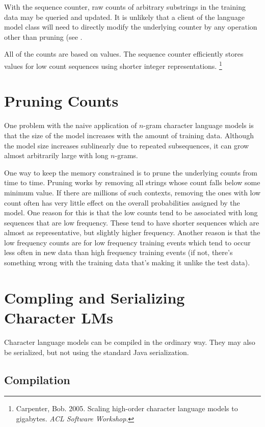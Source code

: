 With the sequence counter, raw counts of arbitrary substrings in
the training data may be queried and updated.  It is unlikely that
a client of the language model class will need to directly modify
the underlying counter by any operation other than pruning (see
.  

All of the counts are based on  values.  The sequence
counter efficiently stores values for low count sequences using
shorter integer representations.%
%
\footnote{Carpenter, Bob.  2005.  Scaling high-order character
language models to gigabytes. {\it ACL Software Workshop}.}



\section{Pruning Counts}\label{section:char-lm-pruning}

One problem with the naive application of $n$-gram character
language models is that the size of the model increases with
the amount of training data.  Although the model size increases
sublinearly due to repeated subsequences, it can grow almost
arbitrarily large with long $n$-grams.

One way to keep the memory constrained is to prune the underlying
counts from time to time.  Pruning works by removing all strings whose
count falls below some minimum value.  If there are millions of such
contexts, removing the ones with low count often has very little
effect on the overall probabilities assigned by the model.  One reason
for this is that the low counts tend to be associated with long
sequences that are low frequency.  These tend to have shorter
sequences which are almost as representative, but slightly higher
frequency.  Another reason is that the low frequency counts are for
low frequency training events which tend to occur less often in new
data than high frequency training events (if not, there's something
wrong with the training data that's making it unlike the test data).


\section{Compling and Serializing Character LMs}

Character language models can be compiled in the ordinary way.
They may also be serialized, but not using the standard Java
serialization.

\subsection{Compilation}

